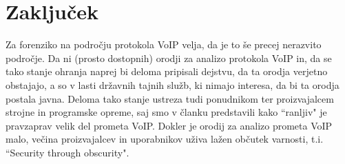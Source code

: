 \documentclass{acm_proc_article-sp}
\begin{document}
%
%
%
\section{Zaključek}
Za forenziko na področju protokola VoIP velja, da je to še precej nerazvito področje. Da ni (prosto dostopnih) orodji za analizo protokola VoIP in, da se tako stanje ohranja naprej bi deloma pripisali dejstvu, da ta orodja verjetno obstajajo, a so v lasti državnih tajnih služb, ki nimajo interesa, da bi ta orodja postala javna. Deloma tako stanje ustreza tudi ponudnikom ter proizvajalcem strojne in programske opreme, saj smo v članku predstavili kako ``ranljiv" je pravzaprav velik del prometa VoIP. Dokler je orodij za analizo prometa VoIP malo, večina proizvajalcev in uporabnikov uživa lažen občutek varnosti, t.i. ``Security through obscurity".


\end{document}
